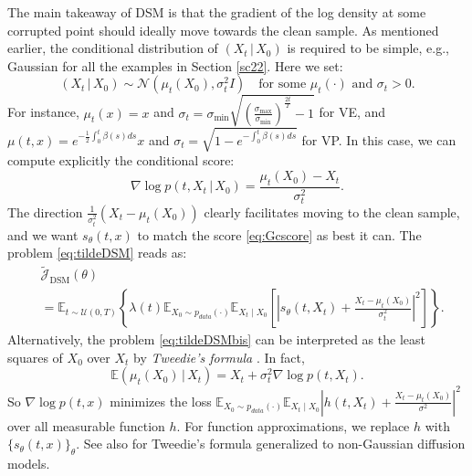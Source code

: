 \documentclass[letterpaper,11pt,reqno]{amsart}
\numberwithin{equation}{section}
\begin{document}
\quad The main takeaway of DSM is that the gradient of the log density at some corrupted point should
ideally move towards the clean sample. 
As mentioned earlier, the conditional distribution of $(X_t \,|\, X_0)$ is required to be simple,
e.g., Gaussian for all the examples in Section \ref{sc22}.
Here we set:
\begin{equation*}
(X_t \,|\, X_0) \sim \mathcal{N}(\mu_t (X_0), \sigma_t^2 I) \quad \mbox{for some }
\mu_t(\cdot) \mbox{ and } \sigma_t > 0.
\end{equation*}
For instance, 
$\mu_t(x) = x$ and $\sigma_t = \sigma_{\min} \sqrt{\left(\frac{\sigma_{\max}}{\sigma_{\min}} \right)^{\frac{2t}{T}}-1}$ for VE,
and $\mu(t,x) = e^{-\frac{1}{2} \int_0^t \beta(s)ds} x$ and $\sigma_t = \sqrt{1 -  e^{- \int_0^t \beta(s)ds}}$
for VP.
In this case, we can compute explicitly the conditional score:
\begin{equation}
\label{eq:Gcscore}
\nabla \log p(t,X_t \,|\, X_0)=\frac{\mu_{t}(X_0)-X_t}{\sigma_t^2}.
\end{equation}
The direction $\frac{1}{\sigma_t^2}(X_t-\mu_{t}(X_0))$
clearly facilitates moving to the clean sample,
and we want $s_{\theta}(t,x)$ to match the score \eqref{eq:Gcscore} as best it can.
The problem \eqref{eq:tildeDSM} reads as:
\begin{equation}
\label{eq:tildeDSMbis}
\begin{aligned}
&\tilde{\mathcal{J}}_{\text{DSM}}(\theta) \\
&=\mathbb{E}_{t\sim\mathcal{U}(0, T)}\left\{\lambda(t) \mathbb{E}_{X_0\sim p_{data}(\cdot)} \mathbb{E}_{X_t \mid X_0}\left[\left|s_{\theta}(t,X_t) + \frac{X_t - \mu_t(X_0)}{\sigma_t^2} \right|^2\right]\right\}.
\end{aligned}
\end{equation}
Alternatively, the problem \eqref{eq:tildeDSMbis} can be interpreted as the least squares of $X_0$ over $X_t$
by {\em Tweedie's formula} \cite{Efron11}.
In fact, 
\begin{equation}
\mathbb{E}\left(\mu_t(X_0)  \, | \, X_t \right) =  X_t + \sigma_t^2 \nabla \log p(t, X_t).
\end{equation}
So $\nabla \log p(t,x)$ minimizes the loss
$\mathbb{E}_{X_0\sim p_{data}(\cdot)} \mathbb{E}_{X_t \mid X_0} \left|h(t,X_t) + \frac{X_t - \mu_t(X_0)}{\sigma^2} \right|^2$
over all measurable function $h$.
For function approximations, we replace $h$ with $\{s_\theta(t,x)\}_\theta$.
See also \cite{TTZ25} for Tweedie's formula generalized to non-Gaussian diffusion models.
\end{document}
